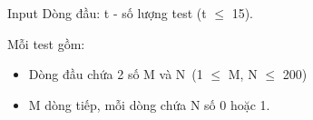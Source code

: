 Input
Dòng đầu: t - số lượng test (t  $\le$  15).

Mỗi test gồm:
\begin{itemize}
	\item Dòng đầu chứa 2 số M và N (1  $\le$  M, N  $\le$  200)
	\item M dòng tiếp, mỗi dòng chứa N số 0 hoặc 1.
\end{itemize}